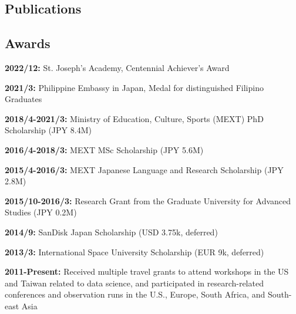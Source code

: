 \documentclass[12pt,letterpaper]{article}
\begin{document}
\ifdefined\withpubs
  \subsection{Publications}
  
  \begin{list}{}{\cvlist}
    
  \end{list}

%     
\fi

\subsection{Awards}
\begin{list}{}{\cvlist}
    \item \textbf{2022/12:} St. Joseph's Academy, Centennial Achiever's Award
    \item \textbf{2021/3:} Philippine Embassy in Japan, Medal for distinguished Filipino Graduates
    \item \textbf{2018/4-2021/3:} Ministry of Education, Culture, Sports (MEXT) PhD Scholarship (JPY 8.4M)
    \item \textbf{2016/4-2018/3:} MEXT MSc Scholarship (JPY 5.6M)
    \item \textbf{2015/4-2016/3:} MEXT Japanese Language and Research Scholarship (JPY 2.8M)
    \item \textbf{2015/10-2016/3:} Research Grant from the Graduate University for Advanced Studies (JPY 0.2M)
    \item \textbf{2014/9:} SanDisk Japan Scholarship (USD 3.75k, deferred)
    \item \textbf{2013/3:} International Space University Scholarship (EUR 9k, deferred)
    \item \textbf{2011-Present:} Received multiple travel grants to attend workshops in the US and Taiwan related to data science, and participated in research-related conferences and observation runs in the U.S., Europe, South Africa, and South-east Asia
\end{list}
\end{document}
